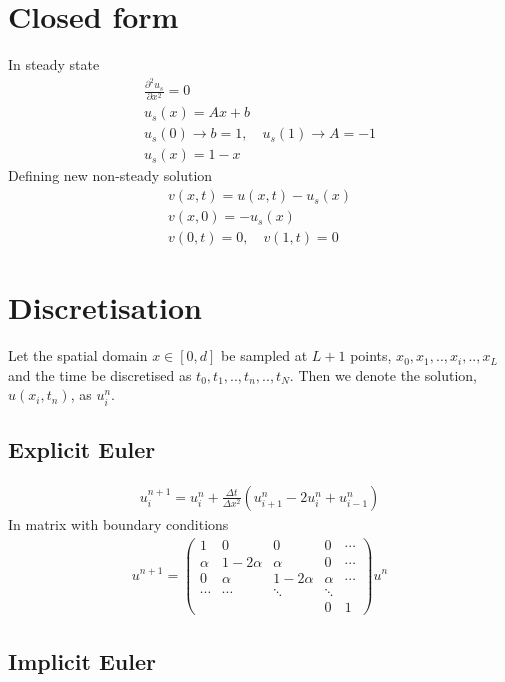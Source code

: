 \documentclass[11pt,a4paper,draft]{article}
\numberwithin{equation}{section}
\begin{document}
\section{Closed form}
In steady state
\begin{gather}
\frac{\partial^2 u_s}{\partial x^2} = 0\\
u_s(x) = Ax + b\\
u_s(0) \to b = 1, \quad
u_s(1) \to A = -1\\
u_s(x) = 1-x
\end{gather}
Defining new non-steady solution
\begin{gather}
v(x,t) = u(x,t) - u_s(x)\\
v(x,0) = -u_s(x)\\
v(0,t) = 0, \quad v(1, t) = 0
\end{gather}


\section{Discretisation}

Let the spatial domain $x \in [0,d]$ be sampled at $L+1$ points, $x_0,x_1,..,x_i,..,x_L$ and the time be discretised as $t_0,t_1,..,t_n,..,t_N$. Then we denote the solution, $u(x_i,t_n)$, as $u_i^n$.  

\subsection{Explicit Euler}

\begin{gather}
u_i^{n+1} = u_i^n + \frac{\Delta t}{\Delta x^2}\left(
u_{i+1}^n - 2u_i^n + u_{i-1}^n
\right)
\end{gather}
In matrix with boundary conditions
\begin{gather}
u^{n+1} = 
\begin{pmatrix}
1 & 0 & 0 & 0 & \cdots\\
\alpha & 1 - 2\alpha & \alpha & 0 & \cdots\\
0 & \alpha & 1-2\alpha & \alpha & \cdots\\
\cdots & \cdots & \ddots & \ddots& \\
&&& 0 & 1
\end{pmatrix}u^n
\end{gather}


\subsection{Implicit Euler}
\end{document}
